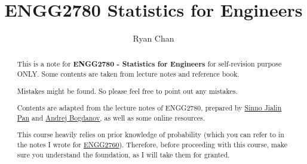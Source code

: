 \documentclass[a4paper]{report}
\author{Ryan Chan}
\title{ENGG2780 Statistics for Engineers}
\begin{document}
\setlength\parindent{0pt}

\maketitle

\newpage

\begin{abstract}
	This is a note for \textbf{ENGG2780 - Statistics for Engineers} for self-revision purpose ONLY. Some contents are taken from lecture notes and reference book.
	
	Mistakes might be found. So please feel free to point out any mistakes.
	
	Contents are adapted from the lecture notes of ENGG2780, prepared by \href{https://www.cse.cuhk.edu.hk/~sinnopan/}{Sinno Jialin Pan} and \href{https://andrejb.net}{Andrej Bogdanov}, as well as some online resources.

	This course heavily relies on prior knowledge of probability (which you can refer to in the notes I wrote for \href{https://www.ryanc.wtf/files/ENGG2760.pdf}{ENGG2760}). Therefore, before proceeding with this course, make sure you understand the foundation, as I will take them for granted.
\end{abstract}

\newpage

\tableofcontents

\setlength{\parskip}{5pt}
\appendix

\end{document}
